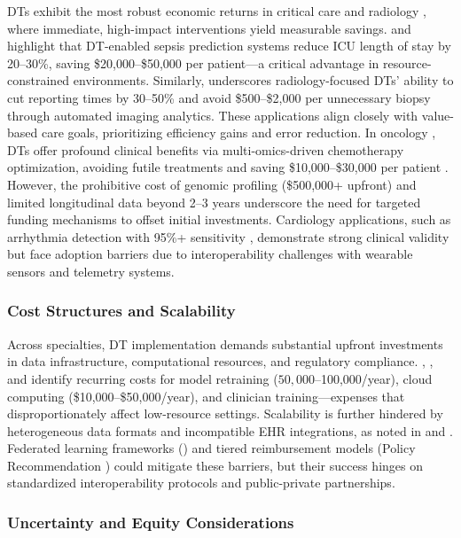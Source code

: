 \documentclass[10pt,a4paper]{article}
\begin{document}
DTs exhibit the most robust economic returns in critical care and radiology , where immediate, high-impact interventions yield measurable savings. \cite{Mascret2024} and \cite{Boverhof2024} highlight that DT-enabled sepsis prediction systems reduce ICU length of stay by 20–30\%, saving \$20,000–\$50,000 per patient—a critical advantage in resource-constrained environments. Similarly, \cite{Bocean2025} underscores radiology-focused DTs’ ability to cut reporting times by 30–50\% and avoid \$500–\$2,000 per unnecessary biopsy through automated imaging analytics. These applications align closely with value-based care goals, prioritizing efficiency gains and error reduction.
In oncology , DTs offer profound clinical benefits via multi-omics-driven chemotherapy optimization, avoiding futile treatments and saving \$10,000–\$30,000 per patient \cite{Wang2025}. However, the prohibitive cost of genomic profiling (\$500,000+ upfront) and limited longitudinal data beyond 2–3 years underscore the need for targeted funding mechanisms to offset initial investments. Cardiology applications, such as arrhythmia detection with 95\%+ sensitivity \cite{Ahmed2023}, demonstrate strong clinical validity but face adoption barriers due to interoperability challenges with wearable sensors and telemetry systems.

\subsubsection*{Cost Structures and Scalability}

Across specialties, DT implementation demands substantial upfront investments in data infrastructure, computational resources, and regulatory compliance.  \cite{Mascret2024}, \cite{Ahmed2023}, and \cite{Bocean2025} identify recurring costs for model retraining ($50,000–$100,000/year), cloud computing (\$10,000–\$50,000/year), and clinician training—expenses that disproportionately affect low-resource settings. Scalability is further hindered by heterogeneous data formats and incompatible EHR integrations, as noted in  \cite{Mascret2024} and \cite{Bocean2025}. Federated learning frameworks (\cite{Boverhof2024}) and tiered reimbursement models (Policy Recommendation \cite{Mascret2024}) could mitigate these barriers, but their success hinges on standardized interoperability protocols and public-private partnerships.

\subsubsection*{Uncertainty and Equity Considerations}
\end{document}
